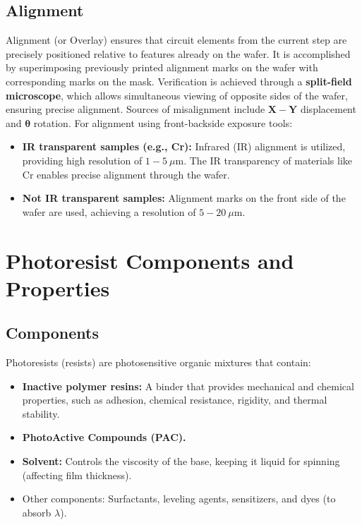 \documentclass{report}
\begin{document}
\subsection{Alignment} Alignment (or Overlay) ensures that circuit elements from the current step are precisely positioned relative to features already on the wafer. It is accomplished by superimposing previously printed alignment marks on the wafer with corresponding marks on the mask.
Verification is achieved through a \textbf{split-field microscope}, which allows simultaneous viewing of opposite sides of the wafer, ensuring precise alignment. Sources of misalignment include $\mathbf{X-Y}$ displacement and $\mathbf{\theta}$ rotation.
For alignment using front-backside exposure tools: 
\begin{itemize} 
    \item \textbf{IR transparent samples (e.g., Cr):} Infrared (IR) alignment is utilized, providing high resolution of $1-5~\mu \text{m}$. The IR transparency of materials like Cr enables precise alignment through the wafer.
    \item \textbf{Not IR transparent samples:} Alignment marks on the front side of the wafer are used, achieving a resolution of $5-20~\mu \text{m}$. 
\end{itemize}

\section{Photoresist Components and Properties}
\subsection{Components}
Photoresists (resists) are photosensitive organic mixtures that contain: 
\begin{itemize} 
    \item \textbf{Inactive polymer resins:} A binder that provides mechanical and chemical properties, such as adhesion, chemical resistance, rigidity, and thermal stability. 
    \item \textbf{PhotoActive Compounds (PAC).} 
    \item \textbf{Solvent:} Controls the viscosity of the base, keeping it liquid for spinning (affecting film thickness). 
    \item Other components: Surfactants, leveling agents, sensitizers, and dyes (to absorb $\lambda$). 
\end{itemize}
\end{document}
